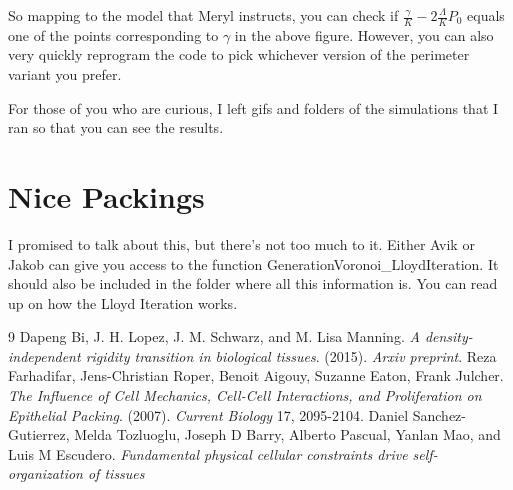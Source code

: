 \documentclass[12pt,a4paper]{article}
\begin{document}
So mapping to the model that Meryl instructs, you can check if $\frac{\gamma}{K} - 2 \frac{\Lambda}{K} P_0$ equals one of the points corresponding to $\gamma$ in the above figure. However, you can also very quickly reprogram the code to pick whichever version of the perimeter variant you prefer. 

For those of you who are curious, I left gifs and folders of the simulations that I ran so that you can see the results. 

\section{Nice Packings}
I promised to talk about this, but there's not too much to it. Either Avik or Jakob can give you access to the function GenerationVoronoi_LloydIteration. It should also be included in the folder where all this information is. You can read up on how the Lloyd Iteration works. 
\begin{thebibliography}{9}
Dapeng Bi, J. H. Lopez, J. M. Schwarz, and M. Lisa Manning.
\textit{A density-independent rigidity transition in biological tissues}.
(2015). \textit{Arxiv preprint}. 
Reza Farhadifar, Jens-Christian Roper, Benoit Aigouy, Suzanne Eaton, Frank Julcher. \textit{The Influence of Cell Mechanics, Cell-Cell Interactions, and Proliferation on Epithelial Packing}. (2007). \textit{Current Biology} 17, 2095-2104. 
Daniel Sanchez-Gutierrez, Melda Tozluoglu, Joseph D Barry, Alberto Pascual, Yanlan Mao, and Luis M Escudero. \textit{Fundamental physical cellular constraints drive self-organization of tissues}
\end{thebibliography}
\end{document}
